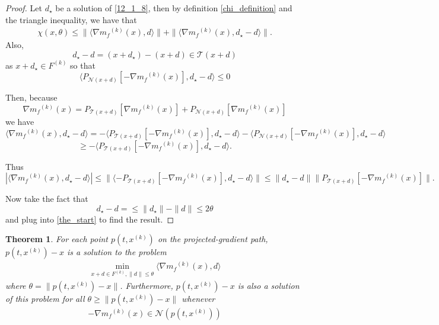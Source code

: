 \documentclass{article}
\newtheorem{theorem}{Theorem}[section]
\theoremstyle{case}
\newcommand{\modelk}{{{m}_f}^{(k)}}
\newcommand{\iteratek}{{x}^{(k)}}
\newcommand{\feasiblek}{{F}^{(k)}}
\newcommand{\ptx}{p(t,\iteratek)}
\begin{document}
\begin{proof}

Let $d_{\star}$ be a solution of \ref{12_1_8}, then by definition \ref{chi_definition} and the triangle inequality, we have that
\begin{align}
\label{the_start}
\chi(x, \theta)\le \|\langle\nabla\modelk(x), d\rangle\| + \|\langle\nabla\modelk(x), d_{\star} - d\rangle\|.
\end{align}
Also,
\[
d_{\star}-d = (x+d_{\star}) - (x+d) \in \mathcal T(x+d)
\]
as $x+d_{\star} \in \feasiblek$ so that
\[
\langle P_{\mathcal N(x+d)}[-\nabla\modelk(x)], d_{\star} - d\rangle \le 0
\]


Then, because
\[
\nabla\modelk(x) = P_{\mathcal T(x+d)}[\nabla\modelk(x)] + P_{\mathcal N(x+d)}[\nabla\modelk(x)]
\]
we have
\[
\langle\nabla\modelk(x), d_{\star} - d\rangle = -\langle P_{\mathcal T(x+d)}[-\nabla\modelk(x)], d_{\star} - d\rangle - \langle P_{\mathcal N(x+d)}[-\nabla\modelk(x)], d_{\star} - d\rangle
\]
\[
\ge -\langle P_{\mathcal T(x+d)}[-\nabla\modelk(x)], d_{\star} - d\rangle.
\]

Thus
\[
|\langle\nabla\modelk(x), d_{\star} - d\rangle| \le \|\langle -P_{\mathcal T(x+d)}[-\nabla\modelk(x)], d_{\star} - d\rangle\| \le \|d_{\star} - d\|\|P_{\mathcal T(x+d)}[-\nabla\modelk(x)]\|.
\]

Now take the fact that
\[
d_{\star} - d =\le \|d_{\star}\|-\|d\| \le 2\theta
\]
and plug into \ref{the_start} to find the result.
\end{proof}


\begin{theorem}
\label{12_1_4}
For each point $\ptx$ on the projected-gradient path, $\ptx-x$ is a solution to the problem
\begin{align}
\label{12_1_8}
\min_{x+d\in \feasiblek, \|d\| \le \theta} \langle \nabla \modelk(x), d\rangle
\end{align}
where $\theta = \|\ptx - x\|$.
Furthermore, $\ptx - x$ is also a solution of this problem for all $\theta \ge \|\ptx - x\|$ whenever
\begin{align}
\label{12_1_9}
-\nabla \modelk(x) \in \mathcal N(\ptx)
\end{align}
\end{theorem}
\end{document}
